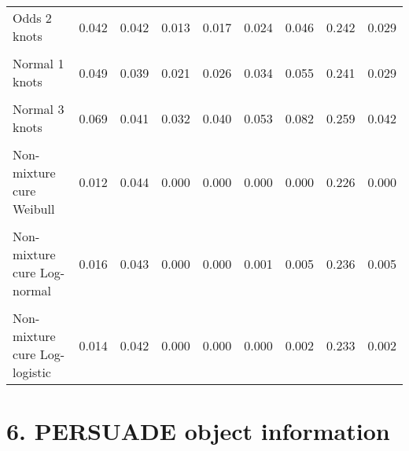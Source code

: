 \documentclass[
]{article}
\begin{document}
\begin{table}[H]
{\begin{tabular}[t]{lrrrrrrrr}
Odds 2 knots & 0.042 & 0.042 & 0.013 & 0.017 & 0.024 & 0.046 & 0.242 & 0.029\\
\cellcolor{gray!10}{Odds 3 knots} & \cellcolor{gray!10}{0.048} & \cellcolor{gray!10}{0.045} & \cellcolor{gray!10}{0.015} & \cellcolor{gray!10}{0.020} & \cellcolor{gray!10}{0.029} & \cellcolor{gray!10}{0.056} & \cellcolor{gray!10}{0.258} & \cellcolor{gray!10}{0.036}\\
Normal 1 knots & 0.049 & 0.039 & 0.021 & 0.026 & 0.034 & 0.055 & 0.241 & 0.029\\
\cellcolor{gray!10}{Normal 2 knots} & \cellcolor{gray!10}{0.053} & \cellcolor{gray!10}{0.040} & \cellcolor{gray!10}{0.023} & \cellcolor{gray!10}{0.028} & \cellcolor{gray!10}{0.037} & \cellcolor{gray!10}{0.060} & \cellcolor{gray!10}{0.237} & \cellcolor{gray!10}{0.032}\\
Normal 3 knots & 0.069 & 0.041 & 0.032 & 0.040 & 0.053 & 0.082 & 0.259 & 0.042\\
\cellcolor{gray!10}{Mixture cure Weibull} & \cellcolor{gray!10}{0.012} & \cellcolor{gray!10}{0.043} & \cellcolor{gray!10}{0.000} & \cellcolor{gray!10}{0.000} & \cellcolor{gray!10}{0.000} & \cellcolor{gray!10}{0.000} & \cellcolor{gray!10}{0.222} & \cellcolor{gray!10}{0.000}\\
Non-mixture cure Weibull & 0.012 & 0.044 & 0.000 & 0.000 & 0.000 & 0.000 & 0.226 & 0.000\\
\cellcolor{gray!10}{Mixture cure Log-normal} & \cellcolor{gray!10}{0.016} & \cellcolor{gray!10}{0.044} & \cellcolor{gray!10}{0.000} & \cellcolor{gray!10}{0.000} & \cellcolor{gray!10}{0.000} & \cellcolor{gray!10}{0.003} & \cellcolor{gray!10}{0.230} & \cellcolor{gray!10}{0.003}\\
Non-mixture cure Log-normal & 0.016 & 0.043 & 0.000 & 0.000 & 0.001 & 0.005 & 0.236 & 0.005\\
\cellcolor{gray!10}{Mixture cure Log-logistic} & \cellcolor{gray!10}{0.014} & \cellcolor{gray!10}{0.043} & \cellcolor{gray!10}{0.000} & \cellcolor{gray!10}{0.000} & \cellcolor{gray!10}{0.000} & \cellcolor{gray!10}{0.003} & \cellcolor{gray!10}{0.234} & \cellcolor{gray!10}{0.002}\\
Non-mixture cure Log-logistic & 0.014 & 0.042 & 0.000 & 0.000 & 0.000 & 0.002 & 0.233 & 0.002\\
\bottomrule
\end{tabular}}
\end{table}

\clearpage

\section{6. PERSUADE object
information}\label{persuade-object-information}
\end{document}
